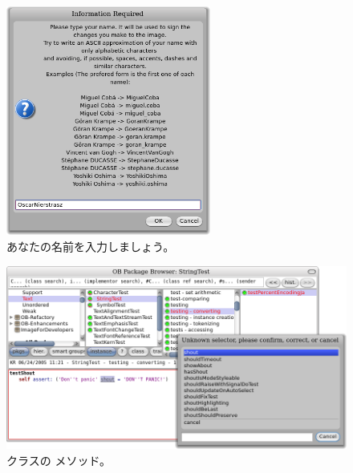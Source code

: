 \documentclass[a4paper,10pt,twoside]{book}
\begin{document}
\begin{figure}[htb]
\centerline {\includegraphics[width=0.6\textwidth]{name}}
\caption{あなたの名前を入力しましょう。}
\end{figure}

\begin{figure}[htb]
\centerline {\includegraphics[width=\textwidth]{testShoutConfirm}}
\caption{ クラスの  メソッド。}
\end{figure}



\end{document}
